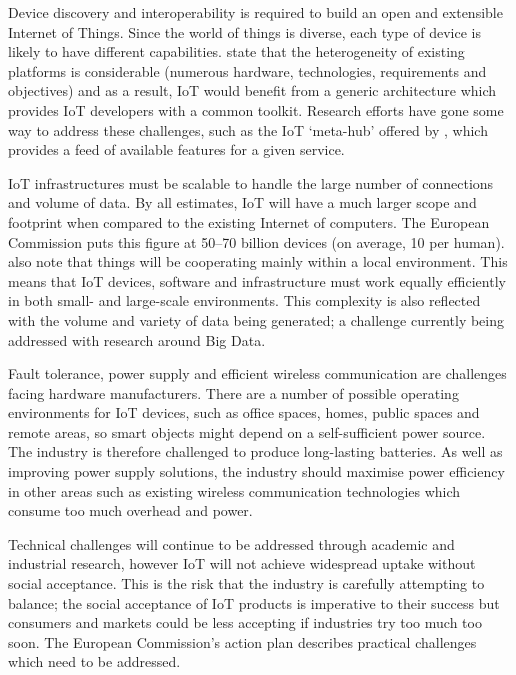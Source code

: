     Device discovery and interoperability is required to build an open and extensible Internet of Things. Since the world of things is diverse, each type of device is likely to have different capabilities. \citet{interoperability:2015} state that the heterogeneity of existing platforms is considerable (numerous hardware, technologies, requirements and objectives) and as a result, IoT would benefit from a generic architecture which provides IoT developers with a common toolkit. Research efforts have gone some way to address these challenges, such as the IoT `meta-hub' offered by \citeauthor{interoperability:2015}, which provides a feed of available features for a given service.

    IoT infrastructures must be scalable to handle the large number of connections and volume of data. By all estimates, IoT will have a much larger scope and footprint when compared to the existing Internet of computers. The European Commission puts this figure at 50--70 billion devices (on average, 10 per human). \citet{fromIoC} also note that things will be cooperating mainly within a local environment. This means that IoT devices, software and infrastructure must work equally efficiently in both small- and large-scale environments. This complexity is also reflected with the volume and variety of data being generated; a challenge currently being addressed with research around Big Data.

    Fault tolerance, power supply and efficient wireless communication are challenges facing hardware manufacturers. There are a number of possible operating environments for IoT devices, such as office spaces, homes, public spaces and remote areas, so smart objects might depend on a self-sufficient power source. The industry is therefore challenged to produce long-lasting batteries. As well as improving power supply solutions, the industry should maximise power efficiency in other areas such as existing wireless communication technologies which consume too much overhead and power. 

    Technical challenges will continue to be addressed through academic and industrial research, however IoT will not achieve widespread uptake without social acceptance. This is the risk that the industry is carefully attempting to balance; the social acceptance of IoT products is imperative to their success but consumers and markets could be less accepting if industries try too much too soon. The European Commission's action plan describes practical challenges which need to be addressed.

